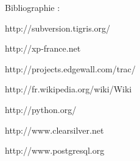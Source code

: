 Bibliographie : 
\item[subversion] http://subversion.tigris.org/
\item[extrem programming] http://xp-france.net
\item[trac] http://projects.edgewall.com/trac/
\item[wiki] http://fr.wikipedia.org/wiki/Wiki
\item[python] http://python.org/
\item[clearsilver] http://www.clearsilver.net
\item[postgresql] http://www.postgresql.org


